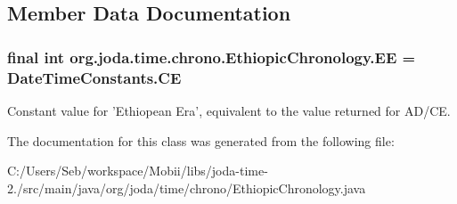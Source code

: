 \subsection{Member Data Documentation}
\hypertarget{classorg_1_1joda_1_1time_1_1chrono_1_1_ethiopic_chronology_a9da0d460869d1c459cf029942d8380d7}{
\subsubsection[{E\-E}]{\setlength{\rightskip}{0pt plus 5cm}final int org.\-joda.\-time.\-chrono.\-Ethiopic\-Chronology.\-E\-E = {\bf Date\-Time\-Constants.\-C\-E}\hspace{0.3cm}{\ttfamily [static]}}}\label{classorg_1_1joda_1_1time_1_1chrono_1_1_ethiopic_chronology_a9da0d460869d1c459cf029942d8380d7}
Constant value for 'Ethiopean Era', equivalent to the value returned for A\-D/\-C\-E. 

The documentation for this class was generated from the following file\-:\begin{DoxyCompactItemize}
\item 
C\-:/\-Users/\-Seb/workspace/\-Mobii/libs/joda-\/time-\/2./src/main/java/org/joda/time/chrono/Ethiopic\-Chronology.\-java\end{DoxyCompactItemize}
